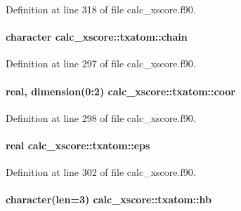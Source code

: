 Definition at line 318 of file calc\-\_\-xscore.\-f90.

\hypertarget{structcalc__xscore_1_1txatom_a6e7ba5ff666dd90e69029603c3426319}{
\paragraph[{chain}]{\setlength{\rightskip}{0pt plus 5cm}character calc\-\_\-xscore\-::txatom\-::chain}}\label{structcalc__xscore_1_1txatom_a6e7ba5ff666dd90e69029603c3426319}


Definition at line 297 of file calc\-\_\-xscore.\-f90.

\hypertarget{structcalc__xscore_1_1txatom_a1745602201a14c33bdbe33623ada958a}{
\paragraph[{coor}]{\setlength{\rightskip}{0pt plus 5cm}real, dimension(0\-:2) calc\-\_\-xscore\-::txatom\-::coor}}\label{structcalc__xscore_1_1txatom_a1745602201a14c33bdbe33623ada958a}


Definition at line 298 of file calc\-\_\-xscore.\-f90.

\hypertarget{structcalc__xscore_1_1txatom_ac850e65e7b750bdd15e8fd204e523e78}{
\paragraph[{eps}]{\setlength{\rightskip}{0pt plus 5cm}real calc\-\_\-xscore\-::txatom\-::eps}}\label{structcalc__xscore_1_1txatom_ac850e65e7b750bdd15e8fd204e523e78}


Definition at line 302 of file calc\-\_\-xscore.\-f90.

\hypertarget{structcalc__xscore_1_1txatom_a951c00465fa76dce90e8b5defdae1a68}{
\paragraph[{hb}]{\setlength{\rightskip}{0pt plus 5cm}character(len=3) calc\-\_\-xscore\-::txatom\-::hb}}\label{structcalc__xscore_1_1txatom_a951c00465fa76dce90e8b5defdae1a68}


